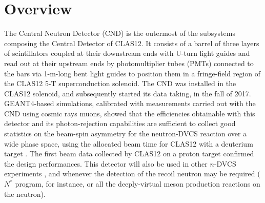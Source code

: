 \section{Overview}
The Central Neutron Detector (CND) is the outermost of the subsystems composing the Central Detector of CLAS12. It consists of a barrel of three layers of scintillators coupled at their downstream ends with U-turn light guides and read out at their upstream ends by photomultiplier tubes (PMTs) connected to the bars via 1-m-long bent light guides to position them in a fringe-field region of the CLAS12 5-T superconduction solenoid. The CND was installed in the CLAS12 solenoid, and subsequently started its data taking, in the fall of 2017. 
GEANT4-based simulations, calibrated with measurements carried out with the CND using cosmic rays muons, showed that the efficiencies obtainable with this detector and its photon-rejection capabilities are sufficient to collect good statistics on the beam-spin asymmetry for the neutron-DVCS reaction over a wide phase space, using the allocated beam time for CLAS12 with a deuterium target \cite{Jlab12_CLAS_n}. The first beam data collected by CLAS12 on a proton target confirmed the design performances. This detector will also be used in other $n$-DVCS experiments \cite{Jlab12_CLAS_n_pol}, and whenever the detection of the recoil neutron may be required ($N^*$ program, for instance, or all the deeply-virtual meson production reactions on the neutron).



